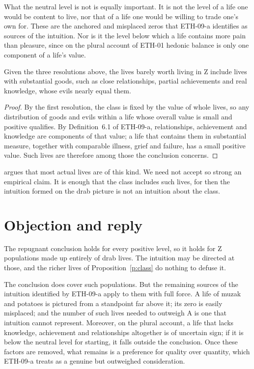 \documentclass{situationist-preprint}
\begin{document}
What the neutral level is not is equally important. It is not the level of a life one would be content to live, nor that of a life one would be willing to trade one's own for. These are the anchored and misplaced zeros that ETH-09-a identifies as sources of the intuition. Nor is it the level below which a life contains more pain than pleasure, since on the plural account of ETH-01 hedonic balance is only one component of a life's value.

\begin{proposition}\label{p:class}
Given the three resolutions above, the lives barely worth living in Z include lives with substantial goods, such as close relationships, partial achievements and real knowledge, whose evils nearly equal them.
\end{proposition}

\begin{proof}
By the first resolution, the class is fixed by the value of whole lives, so any distribution of goods and evils within a life whose overall value is small and positive qualifies. By Definition~6.1 of ETH-09-a, relationships, achievement and knowledge are components of that value; a life that contains them in substantial measure, together with comparable illness, grief and failure, has a small positive value. Such lives are therefore among those the conclusion concerns.
\end{proof}

\citet{Tannsjo2002} argues that most actual lives are of this kind. We need not accept so strong an empirical claim. It is enough that the class includes such lives, for then the intuition formed on the drab picture is not an intuition about the class.

\section{Objection and reply}

\begin{objection}
The repugnant conclusion holds for every positive level, so it holds for Z populations made up entirely of drab lives. The intuition may be directed at those, and the richer lives of Proposition~\ref{p:class} do nothing to defuse it.
\end{objection}

\begin{reply}
The conclusion does cover such populations. But the remaining sources of the intuition identified by ETH-09-a apply to them with full force. A life of muzak and potatoes is pictured from a standpoint far above it; its zero is easily misplaced; and the number of such lives needed to outweigh A is one that intuition cannot represent. Moreover, on the plural account, a life that lacks knowledge, achievement and relationships altogether is of uncertain sign; if it is below the neutral level for starting, it falls outside the conclusion. Once these factors are removed, what remains is a preference for quality over quantity, which ETH-09-a treats as a genuine but outweighed consideration.
\end{reply}
\end{document}
